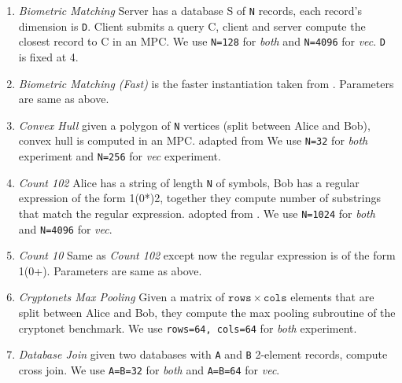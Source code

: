 

\begin{enumerate}
    \item {\em Biometric Matching} Server has a database S of {\tt N} records, each record's dimension is {\tt D}. Client submits a query C, client and server compute the closest record to C in an MPC. We use {\tt N=128} for {\em both} and {\tt N=4096} for {\em vec}. {\tt D} is fixed at 4.
    
    \item {\em Biometric Matching (Fast)} is the faster instantiation taken from . Parameters are same as above.
    
    \item {\em Convex Hull} given a polygon of {\tt N} vertices (split between Alice and Bob), convex hull is computed in an MPC. adapted from  We use {\tt N=32} for {\em both} experiment and {\tt N=256} for {\em vec} experiment.
    
    \item {\em Count 102} Alice has a string of length {\tt N} of symbols, Bob has a regular expression of the form 1(0*)2, together they compute number of substrings that match the regular expression. adopted from . We use {\tt N=1024} for {\em both} and {\tt N=4096} for {\em vec}.
    
    \item {\em Count 10} Same as {\em Count 102} except now the regular expression is of the form 1(0+). Parameters are same as above.
    
    \item {\em Cryptonets Max Pooling} Given a matrix of $\mathtt{rows}\times\mathtt{cols}$ elements that are split between Alice and Bob, they compute the max pooling subroutine of the cryptonet benchmark. We use {\tt rows=64, cols=64} for {\em both} experiment.

    \item {\em Database Join} given two databases with {\tt A} and {\tt B} 2-element records, compute cross join. We use {\tt A=B=32} for {\em both} and {\tt A=B=64} for {\em vec}.
    

\end{enumerate}
